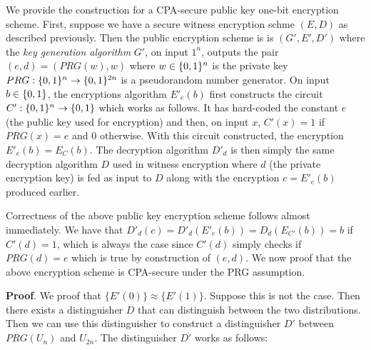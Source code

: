 \documentclass{article}
\begin{document}
\begin{enumerate}
\begin{enumerate}[noitemsep,topsep=\mdcompacttopsep,label=\alph*.]
We provide the construction for a CPA-secure public key one-bit encryption scheme. First, suppose
we have a secure witness encryption schme $(E,D)$ as described previously. Then the public
encryption scheme is is $(G',E',D')$
where the \emph{key generation algorithm} $G'$, on input $1^n$, outputs the pair $(e,d) = (PRG(w), w)$ where
$w \in \{0,1\}^n$ is the private key $PRG: \{0,1\}^n \to \{0,1\}^{2n}$ is a pseudorandom number
generator. On input $b \in \{0,1\}$, the encryptions algorithm $E'_e(b)$ first constructs the circuit 
$C': \{0,1\}^n \to \{0,1\}$ which works as follows. It has hard-coded the constant $e$ (the public key used for encryption) and
then, on input $x$, $C'(x) = 1$ if $PRG(x) = e$ and $0$ otherwise. With this circuit constructed,
the encryption $E'_e(b) = E_C(b)$. The decryption algorithm $D'_d$ is then simply the same decryption
algorithm $D$ used in witness encryption where $d$ (the private encryption key) is fed as input to $D$ along with
the encryption $c = E'_e(b)$ produced earlier.%

Correctness of the above public key encryption scheme follows almost immediately. We have that
$D'_d(c) = D'_d(E'_e(b)) = D_d(E_{C'}(b)) = b$ if $C'(d) = 1$, which is always the case since
$C'(d)$ simply checks if $PRG(d) = e$ which is true by construction of $(e,d)$.%
We now proof that the above encryption scheme is CPA-secure
under the PRG assumption. 

\begin{mdbmarginx}{1ex}{0pt}{1ex}{0pt}%
\noindent{}\textbf{Proof}.  We proof that $\{ E'(0) \} \approx \{ E'(1) \}$. Suppose this is not the case. Then there exists
a distinguisher $D$ that can distinguish between the two distributions. Then we can use this distinguisher
to construct a distinguisher $D'$ between $PRG(U_n)$ and $U_{2n}$. The distinguisher $D'$ works as 
follows:%


\end{mdbmarginx}
\end{enumerate}
\end{enumerate}
\end{document}
